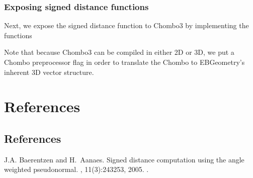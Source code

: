 \documentclass[letterpaper,10pt,english]{sphinxmanual}
\begin{document}
\subsection{Exposing signed distance functions}
\label{\detokenize{Example_Chombo3:exposing-signed-distance-functions}}
\sphinxAtStartPar
Next, we expose the signed distance function to Chombo3 by implementing the functions

\begin{sphinxVerbatim}[commandchars=\\\{\}]
     
   \PYG{p}{[}\PYG{p}{]} \PYG{p}{[}\PYG{p}{]} 
   \PYG{p}{[}\PYG{p}{]} \PYG{p}{[}\PYG{p}{]} \PYG{p}{[}\PYG{p}{]}

   
\end{sphinxVerbatim}

\sphinxAtStartPar
Note that because Chombo3 can be compiled in either 2D or 3D, we put a Chombo preprocessor flag  in order to translate the Chombo  to EBGeometry’s inherent 3D vector structure.


\chapter{References}
\label{\detokenize{index:references}}
\sphinxstepscope


\section{References}
\label{\detokenize{ZZReferences:references}}\label{\detokenize{ZZReferences::doc}}
\begin{sphinxthebibliography}{1}
\sphinxAtStartPar
J.A. Baerentzen and H. Aanaes. Signed distance computation using the angle weighted pseudonormal. , 11(3):243\textendash{}253, 2005. .
\end{sphinxthebibliography}



\renewcommand{\indexname}{Index}
\printindex
\end{document}
